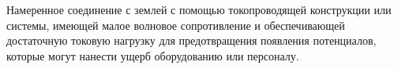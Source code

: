 Намеренное соединение с землей с помощью токопроводящей 
конструкции или системы, имеющей малое волновое сопротивление
и обеспечивающей достаточную токовую нагрузку для
предотвращения появления потенциалов, которые могут 
нанести ущерб оборудованию или персоналу.